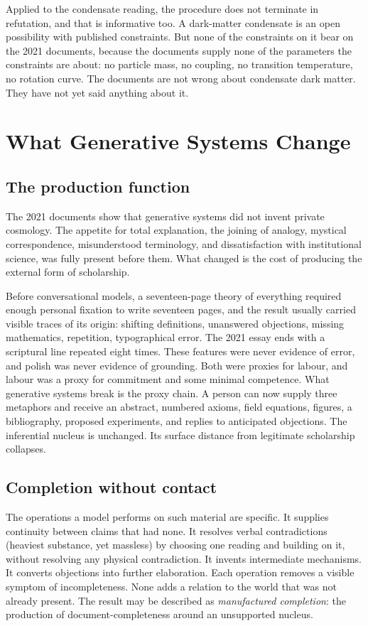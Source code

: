 \documentclass[11pt]{article}
\begin{document}
Applied to the condensate reading, the procedure does not terminate in refutation, and that is informative too. A dark-matter condensate is an open possibility with published constraints. But none of the constraints on it bear on the 2021 documents, because the documents supply none of the parameters the constraints are about: no particle mass, no coupling, no transition temperature, no rotation curve. The documents are not wrong about condensate dark matter. They have not yet said anything about it.

\section{What Generative Systems Change}

\subsection{The production function}

The 2021 documents show that generative systems did not invent private cosmology. The appetite for total explanation, the joining of analogy, mystical correspondence, misunderstood terminology, and dissatisfaction with institutional science, was fully present before them. What changed is the cost of producing the external form of scholarship.

Before conversational models, a seventeen-page theory of everything required enough personal fixation to write seventeen pages, and the result usually carried visible traces of its origin: shifting definitions, unanswered objections, missing mathematics, repetition, typographical error. The 2021 essay ends with a scriptural line repeated eight times. These features were never evidence of error, and polish was never evidence of grounding. Both were proxies for labour, and labour was a proxy for commitment and some minimal competence. What generative systems break is the proxy chain. A person can now supply three metaphors and receive an abstract, numbered axioms, field equations, figures, a bibliography, proposed experiments, and replies to anticipated objections. The inferential nucleus is unchanged. Its surface distance from legitimate scholarship collapses.

\subsection{Completion without contact}

The operations a model performs on such material are specific. It supplies continuity between claims that had none. It resolves verbal contradictions (heaviest substance, yet massless) by choosing one reading and building on it, without resolving any physical contradiction. It invents intermediate mechanisms. It converts objections into further elaboration. Each operation removes a visible symptom of incompleteness. None adds a relation to the world that was not already present. The result may be described as \emph{manufactured completion}: the production of document-completeness around an unsupported nucleus.
\end{document}
